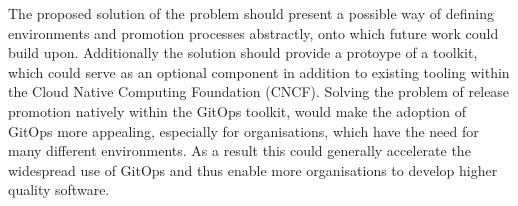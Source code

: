 
\noindent
%
The proposed solution of the problem should
present a possible way of defining environments and promotion processes abstractly,
onto which future work could build upon.
%
Additionally the solution should
provide a protoype of a toolkit,
which could serve as an optional component
in addition to existing tooling within the Cloud Native Computing Foundation (CNCF).
%
Solving the problem of release promotion natively within the GitOps toolkit,
would make the adoption of GitOps more appealing,
especially for organisations, which have the need for many different environments.
%
As a result
this could generally accelerate the widespread use of GitOps
and thus enable more organisations to develop higher quality software.
%














